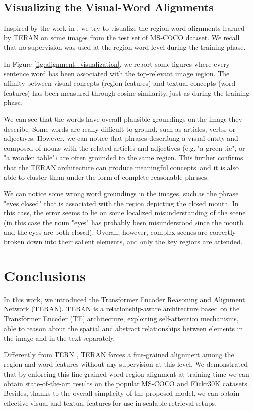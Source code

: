 \documentclass[acmsmall]{acmart}
\newcommand{\majorrevised}[1]{#1}
\begin{document}
\subsection{Visualizing the Visual-Word Alignments}
\label{sec:visualize_alignments}
Inspired by the work in \cite{karpathy2015alignment}, we try to visualize the region-word alignments learned by TERAN on some images from the test set of MS-COCO dataset. We recall that no supervision was used at the region-word level during the training phase.

In Figure \ref{fig:alignment_visualization}, we report some figures where every sentence word has been associated with the top-relevant image region. The affinity between visual concepts (region features) and textual concepts (word features) has been measured through cosine similarity, just as during the training phase. 

We can see that the words have overall plausible groundings on the image they describe. Some words are really difficult to ground, such as articles, verbs, or adjectives. However, we can notice that phrases describing a visual entity and composed of nouns with the related articles and adjectives (e.g. "a green tie", or "a wooden table") are often grounded to the same region.
This further confirms that the TERAN architecture can produce meaningful concepts, and it is also able to cluster them under the form of complete reasonable phrases.

We can notice some wrong word groundings in the images, such as the phrase "eyes closed" that is associated with the region depicting the closed mouth. In this case, the error seems to lie on some localized misunderstanding of the scene (in this case the noun "eyes" has probably been misunderstood since the mouth and the eyes are both closed).
Overall, however, complex scenes are correctly broken down into their salient elements, and only the key regions are attended.

\section{Conclusions}
In this work, we introduced the Transformer Encoder Reasoning and Alignment Network (TERAN). TERAN is a relationship-aware architecture based on the Transformer Encoder (TE) architecture, exploiting self-attention mechanisms, able to reason about the spatial and abstract relationships between elements in the image and in the text separately. 

Differently from TERN \cite{messina2020tern}, TERAN forces a fine-grained alignment among the region and word features without any supervision at this level.
We demonstrated that by enforcing this fine-grained word-region alignment at training time we can obtain state-of-the-art results on the popular MS-COCO and Flickr30K datasets. \majorrevised{Besides, thanks to the overall simplicity of the proposed model, we can obtain effective visual and textual features for use in scalable retrieval setups.}
\end{document}
